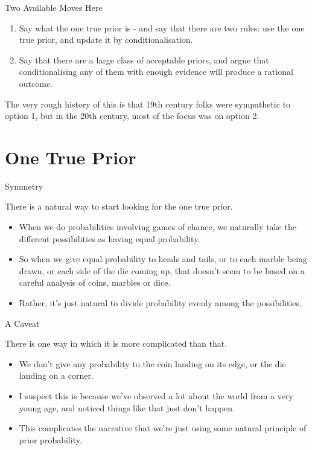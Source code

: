 \documentclass[
  ignorenonframetext,
]{beamer}
\providecommand{\tightlist}{%
  \setlength{\itemsep}{0pt}\setlength{\parskip}{0pt}}
\renewcommand{\,}{\text{, }}
\begin{document}
\begin{frame}{Two Available Moves Here}
\protect\hypertarget{two-available-moves-here}{}

\begin{enumerate}
\tightlist
\item
  Say what the one true prior is - and say that there are two rules: use
  the one true prior, and update it by conditionalisation. \pause
\item
  Say that there are a large class of acceptable priors, and argue that
  conditionalising any of them with enough evidence will produce a
  rational outcome. \pause
\end{enumerate}

The very rough history of this is that 19th century folks were
sympathetic to option 1, but in the 20th century, most of the focus was
on option 2.

\end{frame}

\hypertarget{one-true-prior}{%
\section{One True Prior}\label{one-true-prior}}

\begin{frame}{Symmetry}
\protect\hypertarget{symmetry}{}

There is a natural way to start looking for the one true prior.

\begin{itemize}
\tightlist
\item
  When we do probabilities involving games of chance, we naturally take
  the different possibilities as having equal probability.
\item
  So when we give equal probability to heads and tails, or to each
  marble being drawn, or each side of the die coming up, that doesn't
  seem to be based on a careful analysis of coins, marbles or dice.
\item
  Rather, it's just natural to divide probability evenly among the
  possibilities.
\end{itemize}

\end{frame}

\begin{frame}{A Caveat}
\protect\hypertarget{a-caveat}{}

There is one way in which it is more complicated than that.

\begin{itemize}
\tightlist
\item
  We don't give any probability to the coin landing on its edge, or the
  die landing on a corner.
\item
  I suspect this is because we've observed a lot about the world from a
  very young age, and noticed things like that just don't happen.
\item
  This complicates the narrative that we're just using some natural
  principle of prior probability.
\end{itemize}

\end{frame}
\end{document}

